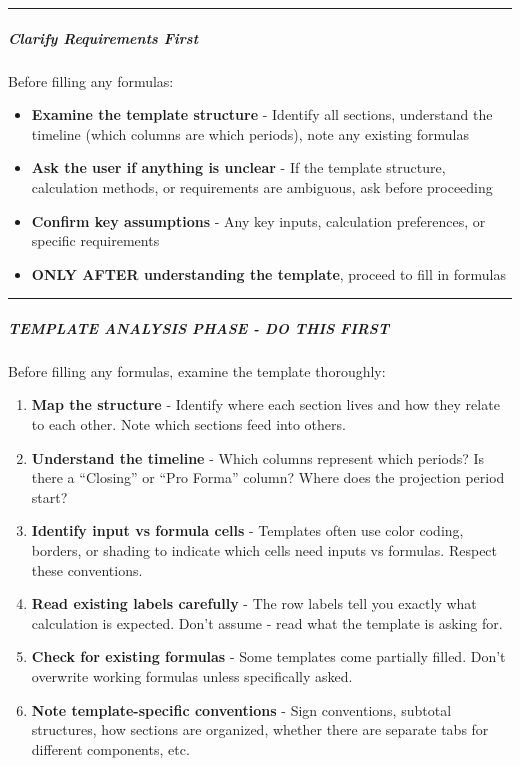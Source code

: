 \documentclass[11pt]{article}
\begin{document}
\vspace{0.5em}\hrule\vspace{0.5em}

\subparagraph{Clarify Requirements First}\mbox{}\par

Before filling any formulas:


\begin{itemize}[leftmargin=*,itemsep=2pt,topsep=2pt]
\item {} \textbf{Examine the template structure} - Identify all sections, understand the timeline (which columns are which periods), note any existing formulas
\item {} \textbf{Ask the user if anything is unclear} - If the template structure, calculation methods, or requirements are ambiguous, ask before proceeding
\item {} \textbf{Confirm key assumptions} - Any key inputs, calculation preferences, or specific requirements
\item {} \textbf{ONLY AFTER understanding the template}, proceed to fill in formulas
\end{itemize}

\vspace{0.5em}\hrule\vspace{0.5em}

\subparagraph{TEMPLATE ANALYSIS PHASE - DO THIS FIRST}\mbox{}\par

Before filling any formulas, examine the template thoroughly:


\begin{enumerate}[leftmargin=*,itemsep=2pt,topsep=2pt]
\item {} \textbf{Map the structure} - Identify where each section lives and how they relate to each other. Note which sections feed into others.
\item {} \textbf{Understand the timeline} - Which columns represent which periods? Is there a ``Closing'' or ``Pro Forma'' column? Where does the projection period start?
\item {} \textbf{Identify input vs formula cells} - Templates often use color coding, borders, or shading to indicate which cells need inputs vs formulas. Respect these conventions.
\item {} \textbf{Read existing labels carefully} - The row labels tell you exactly what calculation is expected. Don't assume - read what the template is asking for.
\item {} \textbf{Check for existing formulas} - Some templates come partially filled. Don't overwrite working formulas unless specifically asked.
\item {} \textbf{Note template-specific conventions} - Sign conventions, subtotal structures, how sections are organized, whether there are separate tabs for different components, etc.
\end{enumerate}
\end{document}
